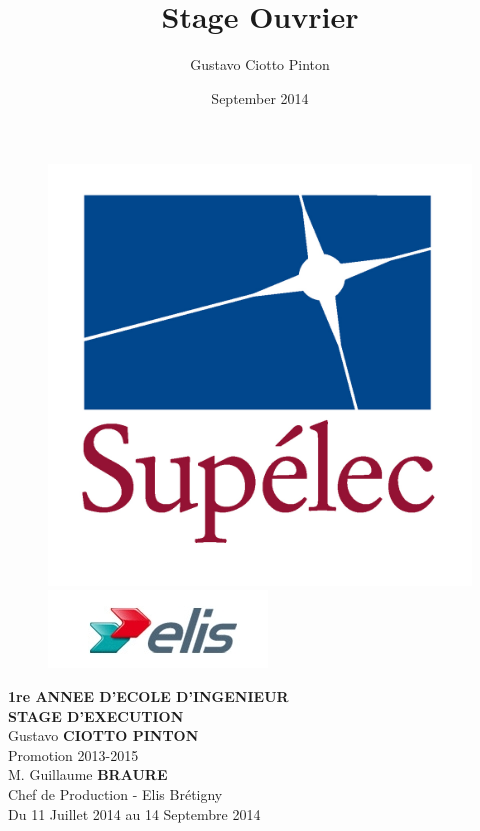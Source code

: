 \documentclass{article}
\title{Stage Ouvrier}
\author{Gustavo Ciotto Pinton}
\date{September 2014}
\begin{document}
\begin{titlepage}
\vspace*{.18\textheight}
\begin{center}
%
\begin{figure}[h]
    \centering
    \includegraphics[scale=0.12]{images/LogoSupelec}\\
    \includegraphics[scale=0.5]{images/LogoElis}
\end{figure}
%
\vspace*{10pt}
\textbf{\LARGE 1re ANNEE D'ECOLE D'INGENIEUR} \\[0.5 cm]
\textbf{\LARGE STAGE D'EXECUTION}\\[1 cm]

Gustavo \textbf{CIOTTO PINTON}\\
Promotion 2013-2015\\[1 cm]

M. Guillaume \textbf{BRAURE}\\
Chef de Production - Elis Brétigny\\[1 cm]

Du 11 Juillet 2014 au 14 Septembre 2014

\end{center}
\end{titlepage}
\end{document}

